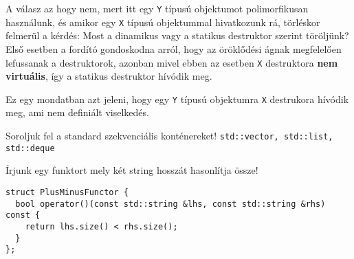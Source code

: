 \documentclass[a4paper,11.5pt]{article}
\begin{document}
	A válasz az hogy nem, mert itt egy \texttt{Y} típusú objektumot polimorfikusan használunk, és amikor egy \texttt{X} típusú objektummal hivatkozunk rá, törléskor felmerül a kérdés: Most a dinamikus vagy a statikus destruktor szerint töröljünk? Első esetben a fordító gondoskodna arról, hogy az öröklődési ágnak megfelelően lefussanak a destruktorok, azonban mivel ebben az esetben \texttt{X} destruktora \textbf{nem virtuális}, így a statikus destruktor hívódik meg. 
	
	Ez egy mondatban azt jeleni, hogy egy \texttt{Y} típusú objektumra \texttt{X} destrukora hívódik meg, ami nem definiált viselkedés.
	\bigskip
	
	Soroljuk fel a standard szekvenciális konténereket! \texttt{std::vector, std::list, std::deque}
	\bigskip
	
	 Írjunk egy funktort mely két string hosszát hasonlítja össze!
	\begin{lstlisting}
struct PlusMinusFunctor {
  bool operator()(const std::string &lhs, const std::string &rhs) const {
    return lhs.size() < rhs.size();
  }
};
		\end{lstlisting}
\end{document}
